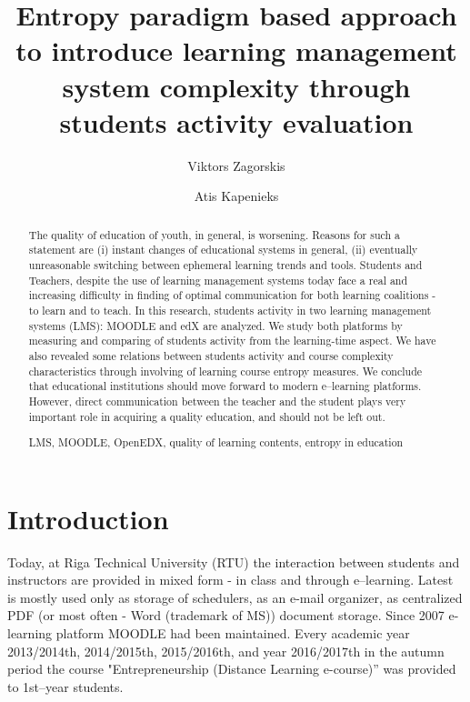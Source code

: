 \documentclass[runningheads,a4paper]{llncs}
\title{Entropy paradigm based approach to introduce learning management system complexity through students activity evaluation}
\author{Viktors Zagorskis\and  Atis Kapenieks  }
\institute{
Distance Education Study Centre of \\Riga Technical University, Latvia, 
University of Liepaja, Latvia
\\atis.kapenieks@rtu.lv
 \\Riga Technical University, Latvia
\\viktors.zagorskis@rtu.lv}
\newcommand{\keywords}[1]{\par\addvspace\baselineskip
\noindent\keywordname\enspace\ignorespaces#1}
\begin{document}
\maketitle

\begin{abstract}
 The quality of education of youth, in general, is worsening.  Reasons for such a statement are (i) instant changes of educational systems in general, (ii) eventually unreasonable switching between ephemeral learning trends and tools.  Students and Teachers, despite the use of learning management systems today face a real and increasing difficulty in finding of optimal communication for both learning coalitions - to learn and to teach.  In this research, students activity in two learning management systems (LMS): MOODLE and edX are analyzed.  We study both  platforms by measuring and comparing of students activity from the learning-time aspect.
 We have also revealed some relations between students activity and course complexity characteristics through involving of learning course entropy measures. 
 We conclude that educational institutions should move forward to  modern e--learning platforms.
 However, direct communication between the teacher and the student plays very important role in acquiring a quality education, and should not be left out.
\keywords{LMS, MOODLE, OpenEDX, quality of learning contents, entropy in education}
\end{abstract}



\section{Introduction}

Today, at Riga Technical University (RTU) the interaction between students and instructors are provided in mixed form - in class and through e--learning. Latest is mostly used only as storage of schedulers, as an e-mail organizer, as centralized PDF (or most often - Word (trademark of MS)) document storage. 
Since 2007 e-learning platform MOODLE had been maintained. Every academic year 2013/2014th, 2014/2015th, 2015/2016th, and year 2016/2017th in the autumn period the course "Entrepreneurship (Distance Learning e-course)”  was provided to 1st--year students.
\end{document}

